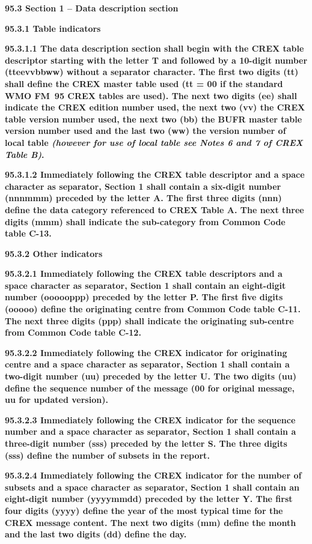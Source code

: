 \textbf{95.3 Section 1 -- Data description section}

\textbf{95.3.1 Table indicators}

\textbf{95.3.1.1 The data description section shall begin with the CREX table descriptor starting with the letter T and followed by a 10-digit number (tteevvbbww) without a separator character. The first two digits (tt) shall define the CREX master table used (tt = 00 if the standard WMO FM~95 CREX tables are used). The next two digits (ee) shall indicate the CREX edition number used, the next two (vv) the CREX table version number used, the next two (bb) the BUFR master table version number used and the last two (ww) the version number of local table \emph{(however for use of local table see Notes 6 and 7 of CREX Table B)}.}

\textbf{95.3.1.2 Immediately following the CREX table descriptor and a space character as separator, Section 1 shall contain a six-digit number (nnnmmm) preceded by the letter A. The first three digits (nnn) define the data category referenced to CREX Table A. The next three digits (mmm) shall indicate the sub-category from Common Code table C-13.}

\textbf{95.3.2 Other indicators}

\textbf{95.3.2.1 Immediately following the CREX table descriptors and a space character as separator, Section 1 shall contain an eight-digit number (oooooppp) preceded by the letter P. The first five digits (ooooo) define the originating centre from Common Code table C-11. The next three digits (ppp) shall indicate the originating sub-centre from Common Code table C-12.}

\textbf{95.3.2.2 Immediately following the CREX indicator for originating centre and a space character as separator, Section 1 shall contain a two-digit number (uu) preceded by the letter U. The two digits (uu) define the sequence number of the message (00 for original message, uu for updated version).}

\textbf{95.3.2.3 Immediately following the CREX indicator for the sequence number and a space character as separator, Section 1 shall contain a three-digit number (sss) preceded by the letter S. The three digits (sss) define the number of subsets in the report.}

\textbf{95.3.2.4 Immediately following the CREX indicator for the number of subsets and a space character as separator, Section 1 shall contain an eight-digit number (yyyymmdd) preceded by the letter Y. The first four digits (yyyy) define the year of the most typical time for the CREX message content. The next two digits (mm) define the month and the last two digits (dd) define the day.}

